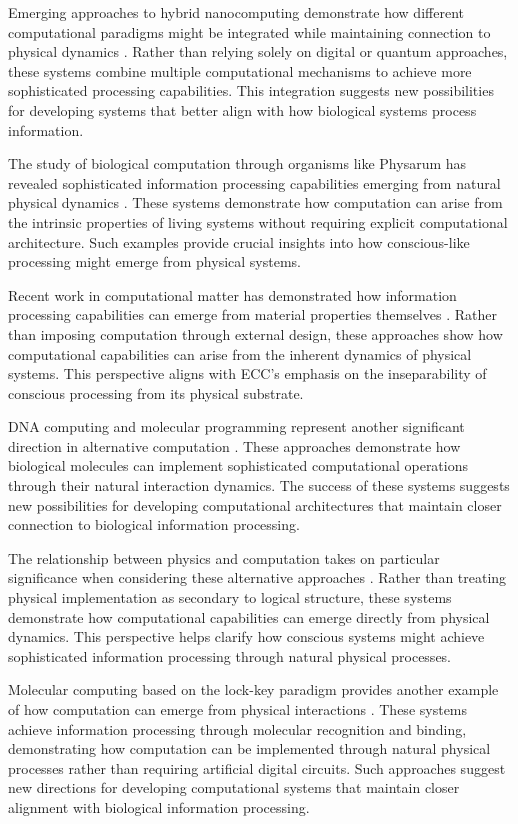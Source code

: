 \begin{refsection}
Emerging approaches to hybrid nanocomputing demonstrate how different computational paradigms might be integrated while maintaining connection to physical dynamics \cite{Mayne2019}. Rather than relying solely on digital or quantum approaches, these systems combine multiple computational mechanisms to achieve more sophisticated processing capabilities. This integration suggests new possibilities for developing systems that better align with how biological systems process information.

The study of biological computation through organisms like Physarum has revealed sophisticated information processing capabilities emerging from natural physical dynamics \cite{Nakagaki2020}. These systems demonstrate how computation can arise from the intrinsic properties of living systems without requiring explicit computational architecture. Such examples provide crucial insights into how conscious-like processing might emerge from physical systems.

Recent work in computational matter has demonstrated how information processing capabilities can emerge from material properties themselves \cite{Stepney2018}. Rather than imposing computation through external design, these approaches show how computational capabilities can arise from the inherent dynamics of physical systems. This perspective aligns with ECC's emphasis on the inseparability of conscious processing from its physical substrate.

DNA computing and molecular programming represent another significant direction in alternative computation \cite{Tanaka2021}. These approaches demonstrate how biological molecules can implement sophisticated computational operations through their natural interaction dynamics. The success of these systems suggests new possibilities for developing computational architectures that maintain closer connection to biological information processing.

The relationship between physics and computation takes on particular significance when considering these alternative approaches \cite{Toffoli2019}. Rather than treating physical implementation as secondary to logical structure, these systems demonstrate how computational capabilities can emerge directly from physical dynamics. This perspective helps clarify how conscious systems might achieve sophisticated information processing through natural physical processes.

Molecular computing based on the lock-key paradigm provides another example of how computation can emerge from physical interactions \cite{Zauner2020}. These systems achieve information processing through molecular recognition and binding, demonstrating how computation can be implemented through natural physical processes rather than requiring artificial digital circuits. Such approaches suggest new directions for developing computational systems that maintain closer alignment with biological information processing.


\end{refsection}
